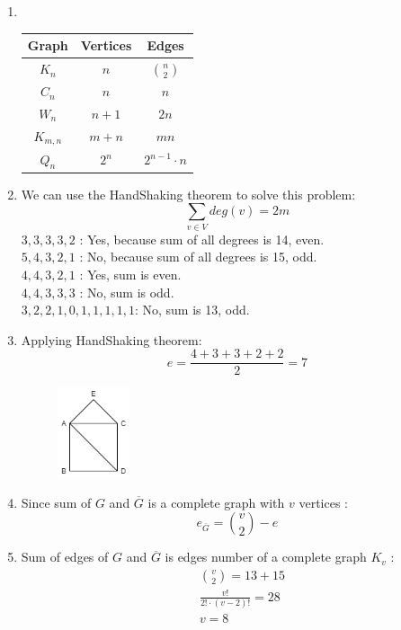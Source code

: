 \documentclass[a4paper]{article}
\begin{document}
	\begin{enumerate}
		\item \phantom{New line}\\
		      \begin{tabular}{c|c|c}
			      Graph     & Vertices & Edges            \\
			      \hline
			      $K_n$     & $n$      & ${n\choose 2}$   \\
			      \hline
			      $C_n$     & $n$      & $n$              \\
			      \hline
			      $W_n$     & $n+1$    & $2n$             \\
			      \hline
			      $K_{m,n}$ & $m+n$    & $mn$             \\ 
			      \hline
			      $Q_n$     & $2^{n}$  & $2^{n-1}\cdot n$ \\
		      \end{tabular}
		\item 
		      We can use the HandShaking theorem to solve this problem:
		      \begin{equation*}
			      \sum_{v \in V} deg(v) = 2m
		      \end{equation*}
		      $3,3,3,3,2$ : Yes, because sum of all degrees is 14, even. \\
		      $5,4,3,2,1$ : No, because sum of all degrees is 15, odd. \\
		      $4,4,3,2,1$ : Yes, sum is even. \\
		      $4,4,3,3,3$ : No, sum is odd. \\
		      $3,2,2,1,0,1,1,1,1,1$: No, sum is 13, odd.
		      
		\item Applying HandShaking theorem:
		      \begin{equation*}
			      e = \frac{4+3+3+2+2}{2} = 7 
		      \end{equation*}
		      \begin{figure}[H]
			      \centering
			      \includegraphics[width=0.2\textwidth]{gprob2.png}
		      \end{figure}
		\item Since sum of $G$ and $\overline{G}$ is a complete graph with $v$ vertices :
		      \begin{equation*}
			      e_{ \overline{G}} = {v \choose 2} - e
		      \end{equation*}
		\item Sum of edges of $G$ and $\overline{G}$ is edges number of a complete graph $K_v$ :
		      \begin{align*}
			       & {v \choose 2} = 13 + 15        \\
			       & \frac{v!}{2!\cdot (v-2)!} = 28 \\
			       & v = 8
		      \end{align*}
	\end{enumerate}
\end{document}
